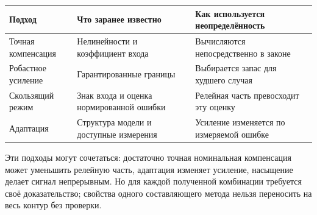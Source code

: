 \begin{center}
\begin{tabularx}{\textwidth}{@{}lYY@{}}
\toprule
Подход & Что заранее известно & Как используется неопределённость\\
\midrule
Точная компенсация & Нелинейности и коэффициент входа & Вычисляются непосредственно в законе\\
Робастное усиление & Гарантированные границы & Выбирается запас для худшего случая\\
Скользящий режим & Знак входа и оценка нормированной ошибки & Релейная часть превосходит эту оценку\\
Адаптация & Структура модели и доступные измерения & Усиление изменяется по измеряемой ошибке\\
\bottomrule
\end{tabularx}
\end{center}
Эти подходы могут сочетаться: достаточно точная номинальная компенсация
может уменьшить релейную часть, адаптация изменяет усиление,
насыщение делает сигнал непрерывным.
Но для каждой полученной комбинации требуется своё доказательство;
свойства одного составляющего метода нельзя переносить на весь контур
без проверки.
